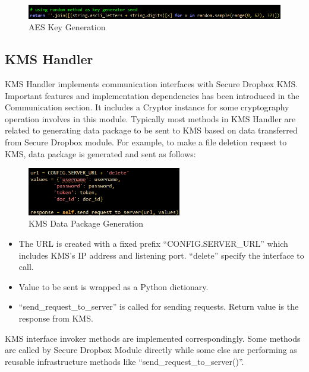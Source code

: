 \begin{figure}[h]
        \centering
        \includegraphics[width=1.0\textwidth]{figures/AES_Key_Generation.png}
        \caption[AES Key Generation] {AES Key Generation}
\end{figure}

\subsection{KMS Handler}
KMS Handler implements communication interfaces with Secure Dropbox KMS. Important features and implementation dependencies has been introduced in the Communication section. It includes a Cryptor instance for some cryptography operation involves in this module. Typically most methods in KMS Handler are related to generating data package to be sent to KMS based on data transferred from Secure Dropbox module. For example, to make a file deletion request to KMS, data package is generated and sent as follows:

\begin{figure}[h]
        \centering
        \includegraphics[width=0.6\textwidth]{figures/KMS_Data_Package_Generation.png}
        \caption[KMS Data Package Generation] {KMS Data Package Generation}
\end{figure}

\begin{itemize}
  \item
  The URL is created with a fixed prefix ``CONFIG.SERVER\_URL'' which includes KMS’s IP address and listening port. ``delete'' specify the interface to call.
  \item
  Value to be sent is wrapped as a Python dictionary.
  \item
  ``send\_request\_to\_server'' is called for sending requests. Return value is the response from KMS.
\end{itemize}

KMS interface invoker methods are implemented correspondingly. Some methods are called by Secure Dropbox Module directly while some else are performing as reusable infrastructure methods like ``send\_request\_to\_server()''.

